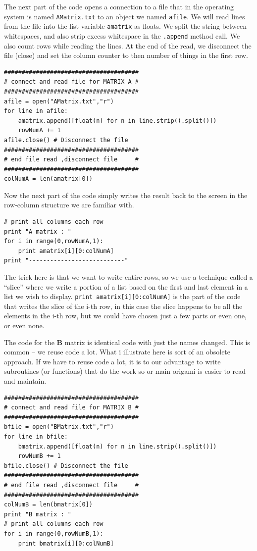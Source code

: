 The next part of the code opens a connection to a file that in the operating system is named \texttt{AMatrix.txt} to an object we named \texttt{afile}.
We will read lines from the file into the list variable \texttt{amatrix} as floats.
We split the string between whitespaces, and also strip excess whitespace in the \texttt{.append} method call.
We also count rows while reading the lines.  At the end of the read, we disconnect the file (close) and set the column counter to then number of things in the first row.
\begin{verbatim}
######################################
# connect and read file for MATRIX A #
######################################
afile = open("AMatrix.txt","r")
for line in afile:
    amatrix.append([float(n) for n in line.strip().split()])
    rowNumA += 1
afile.close() # Disconnect the file
######################################
# end file read ,disconnect file     #
######################################
colNumA = len(amatrix[0])
\end{verbatim}

Now the next part of the code simply writes the result back to the screen in the row-column structure we are familiar with.

\begin{verbatim}
# print all columns each row
print "A matrix : "
for i in range(0,rowNumA,1):
    print amatrix[i][0:colNumA]
print "---------------------------"   
\end{verbatim}

The trick here is that we want to write entire rows, so we use a technique called a ``slice'' where we write a portion of a list based on the first and last element in a list we wish to display.  
\texttt{print amatrix[i][0:colNumA]} is the part of the code that writes the slice of the i-th row, in this case the slice happens to be all the elements in the i-th row, but we could have chosen just a few parts or even one, or even none.

The code for the $\mathbf{B}$ matrix is identical code with just the names changed.   This is common -- we reuse code a lot.  What i illustrate here is sort of an obsolete approach.  If we have to reuse code a lot, it is to our advantage to write subroutines (or functions) that do the work so or main origami is easier to read and maintain.

\begin{verbatim}
######################################
# connect and read file for MATRIX B #
######################################
bfile = open("BMatrix.txt","r")
for line in bfile:
    bmatrix.append([float(n) for n in line.strip().split()])
    rowNumB += 1
bfile.close() # Disconnect the file
######################################
# end file read ,disconnect file     #
######################################
colNumB = len(bmatrix[0])
print "B matrix : "
# print all columns each row
for i in range(0,rowNumB,1):
    print bmatrix[i][0:colNumB]
 \end{verbatim}
 
